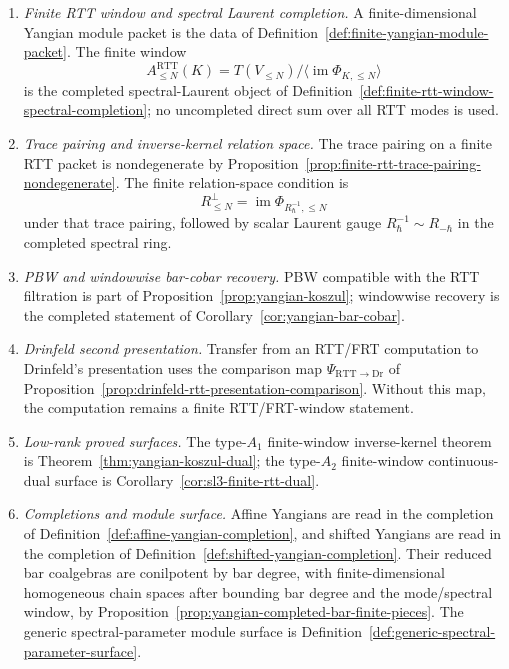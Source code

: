 \begin{proposition}
\begin{enumerate}[label=\textup{(\roman*)}]
\item \emph{Finite RTT window and spectral Laurent completion.}
 A finite-dimensional Yangian module packet is the data of
 Definition~\ref{def:finite-yangian-module-packet}.  The finite
 window
 \[
 A^{\mathrm{RTT}}_{\le N}(K)
 =
 T(V_{\le N})/\langle\operatorname{im}\Phi_{K,\le N}\rangle
 \]
 is the completed spectral-Laurent object of
 Definition~\ref{def:finite-rtt-window-spectral-completion}; no
 uncompleted direct sum over all RTT modes is used.

\item \emph{Trace pairing and inverse-kernel relation space.}
 The trace pairing on a finite RTT packet is nondegenerate by
 Proposition~\ref{prop:finite-rtt-trace-pairing-nondegenerate}.  The
 finite relation-space condition is
 \[
 R_{\le N}^{\perp}
 =
 \operatorname{im}\Phi_{R_\hbar^{-1},\le N}
 \]
 under that trace pairing, followed by scalar Laurent gauge
 $R_\hbar^{-1}\sim R_{-\hbar}$ in the completed spectral ring.

\item \emph{PBW and windowwise bar-cobar recovery.}
 PBW compatible with the RTT filtration is part of
 Proposition~\ref{prop:yangian-koszul}; windowwise recovery is the
 completed statement of Corollary~\ref{cor:yangian-bar-cobar}.

\item \emph{Drinfeld second presentation.}
 Transfer from an RTT/FRT computation to Drinfeld's presentation uses
 the comparison map
 $\Psi_{\mathrm{RTT}\to\mathrm{Dr}}$ of
 Proposition~\ref{prop:drinfeld-rtt-presentation-comparison}.  Without
 this map, the computation remains a finite RTT/FRT-window statement.

\item \emph{Low-rank proved surfaces.}
 The type-$A_1$ finite-window inverse-kernel theorem is
 Theorem~\ref{thm:yangian-koszul-dual}; the type-$A_2$ finite-window
 continuous-dual surface is Corollary~\ref{cor:sl3-finite-rtt-dual}.

\item \emph{Completions and module surface.}
 Affine Yangians are read in the completion of
 Definition~\ref{def:affine-yangian-completion}, and shifted Yangians
 are read in the completion of
 Definition~\ref{def:shifted-yangian-completion}.  Their reduced bar coalgebras
 are conilpotent by bar degree, with finite-dimensional homogeneous
 chain spaces after bounding bar degree and the mode/spectral window,
 by Proposition~\ref{prop:yangian-completed-bar-finite-pieces}.  The
 generic spectral-parameter module surface is
 Definition~\ref{def:generic-spectral-parameter-surface}.


\end{enumerate}
\end{proposition}

